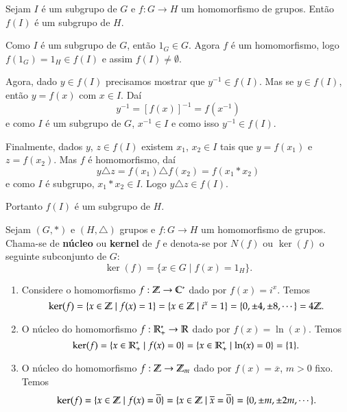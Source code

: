 \begin{proposicao}
	Sejam $I$ é um subgrupo de $G$ e $f : G \to H$ um homomorfismo de grupos. Então $f(I)$ é um subgrupo de $H$.
\end{proposicao}
\begin{prova}
	Como $I$ é um subgrupo de $G$, então $1_G \in G$. Agora $f$ é um homomorfismo, logo $f(1_G) = 1_H \in f(I)$ e assim $f(I) \ne \emptyset$.

	Agora, dado $y \in f(I)$ precisamos mostrar que $y^{-1} \in f(I)$. Mas se $y \in f(I)$, então $y = f(x)$ com $x \in I$. Daí
	\[
		y^{-1} = [f(x)]^{-1} = f(x^{-1})
	\]
	e como $I$ é um subgrupo de $G$, $x^{-1} \in I$ e como isso $y^{-1} \in f(I)$.

	Finalmente, dados $y$, $z \in f(I)$ existem $x_1$, $x_2 \in I$ tais que $y = f(x_1)$ e $z = f(x_2)$. Mas $f$ é homomorfismo, daí
	\[
		y\triangle z = f(x_1)\triangle f(x_2) = f(x_1*x_2)
	\]
	e como $I$ é subgrupo, $x_1*x_2 \in I$. Logo $y\triangle z \in f(I)$.

	Portanto $f(I)$ é um subgrupo de $H$.
\end{prova}

\begin{definicao}
	Sejam $(G, *)$ e $(H, \triangle)$ grupos e $f : G \to H$ um homomorfismo de grupos. Chama-se de \textbf{núcleo} ou \textbf{kernel} de $f$ e denota-se por $N(f)$ ou $\ker(f)$ o seguinte subconjunto de $G$:
	\[
		\ker(f) = \{x \in G \mid f(x) = 1_H\}.
	\]
\end{definicao}

\begin{exemplos}
	\begin{enumerate}
		\item Considere o homomorfismo $f : \mathbb{Z} \to \mathbb{C}^*$ dado por $f(x) = i^x$. Temos
		\[
			\ker(f) = \{x \in \mathbb{Z} \mid f(x) = 1\} = \{x \in \mathbb{Z} \mid i^x = 1\} = \{0, \pm 4, \pm 8, \cdots\} = 4\mathbb{Z}.
		\]

		\item O núcleo do homomorfismo $f : \mathbb{R}^*_+ \to \mathbb{R}$ dado por $f(x) = \ln(x)$. Temos
		\[
			\ker(f) = \{x \in \mathbb{R}^*_+ \mid f(x) = 0\} = \{x \in \mathbb{R}^*_+ \mid \ln(x) = 0\} = \{1\}.
		\]

		\item O núcleo do homomorfismo $f : \mathbb{Z} \to \mathbb{Z}_m$ dado por $f(x) = \overline{x}$, $m > 0$ fixo. Temos
		\[
			\ker(f) = \{x \in \mathbb{Z} \mid f(x) = \overline{0}\} = \{x \in \mathbb{Z} \mid \overline{x} = \overline{0}\} = \{0, \pm m, \pm 2m, \cdots\}.
		\]
	\end{enumerate}
\end{exemplos}

